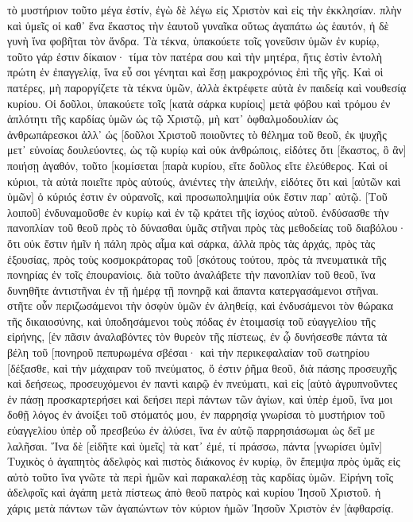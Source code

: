 τὸ μυστήριον τοῦτο μέγα ἐστίν, ἐγὼ δὲ λέγω εἰς Χριστὸν καὶ εἰς τὴν ἐκκλησίαν. 
πλὴν καὶ ὑμεῖς οἱ καθ᾽ ἕνα ἕκαστος τὴν ἑαυτοῦ γυναῖκα οὕτως ἀγαπάτω ὡς ἑαυτόν, ἡ δὲ γυνὴ ἵνα φοβῆται τὸν ἄνδρα. 
Τὰ τέκνα, ὑπακούετε τοῖς γονεῦσιν ὑμῶν ἐν κυρίῳ, τοῦτο γάρ ἐστιν δίκαιον· 
τίμα τὸν πατέρα σου καὶ τὴν μητέρα, ἥτις ἐστὶν ἐντολὴ πρώτη ἐν ἐπαγγελίᾳ, 
ἵνα εὖ σοι γένηται καὶ ἔσῃ μακροχρόνιος ἐπὶ τῆς γῆς. 
Καὶ οἱ πατέρες, μὴ παροργίζετε τὰ τέκνα ὑμῶν, ἀλλὰ ἐκτρέφετε αὐτὰ ἐν παιδείᾳ καὶ νουθεσίᾳ κυρίου. 
Οἱ δοῦλοι, ὑπακούετε τοῖς [κατὰ σάρκα κυρίοις] μετὰ φόβου καὶ τρόμου ἐν ἁπλότητι τῆς καρδίας ὑμῶν ὡς τῷ Χριστῷ, 
μὴ κατ᾽ ὀφθαλμοδουλίαν ὡς ἀνθρωπάρεσκοι ἀλλ᾽ ὡς [δοῦλοι Χριστοῦ ποιοῦντες τὸ θέλημα τοῦ θεοῦ, ἐκ ψυχῆς 
μετ᾽ εὐνοίας δουλεύοντες, ὡς τῷ κυρίῳ καὶ οὐκ ἀνθρώποις, 
εἰδότες ὅτι [ἕκαστος, ὃ ἂν] ποιήσῃ ἀγαθόν, τοῦτο [κομίσεται [παρὰ κυρίου, εἴτε δοῦλος εἴτε ἐλεύθερος. 
Καὶ οἱ κύριοι, τὰ αὐτὰ ποιεῖτε πρὸς αὐτούς, ἀνιέντες τὴν ἀπειλήν, εἰδότες ὅτι καὶ [αὐτῶν καὶ ὑμῶν] ὁ κύριός ἐστιν ἐν οὐρανοῖς, καὶ προσωπολημψία οὐκ ἔστιν παρ᾽ αὐτῷ. 
[Τοῦ λοιποῦ] ἐνδυναμοῦσθε ἐν κυρίῳ καὶ ἐν τῷ κράτει τῆς ἰσχύος αὐτοῦ. 
ἐνδύσασθε τὴν πανοπλίαν τοῦ θεοῦ πρὸς τὸ δύνασθαι ὑμᾶς στῆναι πρὸς τὰς μεθοδείας τοῦ διαβόλου· 
ὅτι οὐκ ἔστιν ἡμῖν ἡ πάλη πρὸς αἷμα καὶ σάρκα, ἀλλὰ πρὸς τὰς ἀρχάς, πρὸς τὰς ἐξουσίας, πρὸς τοὺς κοσμοκράτορας τοῦ [σκότους τούτου, πρὸς τὰ πνευματικὰ τῆς πονηρίας ἐν τοῖς ἐπουρανίοις. 
διὰ τοῦτο ἀναλάβετε τὴν πανοπλίαν τοῦ θεοῦ, ἵνα δυνηθῆτε ἀντιστῆναι ἐν τῇ ἡμέρᾳ τῇ πονηρᾷ καὶ ἅπαντα κατεργασάμενοι στῆναι. 
στῆτε οὖν περιζωσάμενοι τὴν ὀσφὺν ὑμῶν ἐν ἀληθείᾳ, καὶ ἐνδυσάμενοι τὸν θώρακα τῆς δικαιοσύνης, 
καὶ ὑποδησάμενοι τοὺς πόδας ἐν ἑτοιμασίᾳ τοῦ εὐαγγελίου τῆς εἰρήνης, 
[ἐν πᾶσιν ἀναλαβόντες τὸν θυρεὸν τῆς πίστεως, ἐν ᾧ δυνήσεσθε πάντα τὰ βέλη τοῦ [πονηροῦ πεπυρωμένα σβέσαι· 
καὶ τὴν περικεφαλαίαν τοῦ σωτηρίου [δέξασθε, καὶ τὴν μάχαιραν τοῦ πνεύματος, ὅ ἐστιν ῥῆμα θεοῦ, 
διὰ πάσης προσευχῆς καὶ δεήσεως, προσευχόμενοι ἐν παντὶ καιρῷ ἐν πνεύματι, καὶ εἰς [αὐτὸ ἀγρυπνοῦντες ἐν πάσῃ προσκαρτερήσει καὶ δεήσει περὶ πάντων τῶν ἁγίων, 
καὶ ὑπὲρ ἐμοῦ, ἵνα μοι δοθῇ λόγος ἐν ἀνοίξει τοῦ στόματός μου, ἐν παρρησίᾳ γνωρίσαι τὸ μυστήριον τοῦ εὐαγγελίου 
ὑπὲρ οὗ πρεσβεύω ἐν ἁλύσει, ἵνα ἐν αὐτῷ παρρησιάσωμαι ὡς δεῖ με λαλῆσαι. 
Ἵνα δὲ [εἰδῆτε καὶ ὑμεῖς] τὰ κατ᾽ ἐμέ, τί πράσσω, πάντα [γνωρίσει ὑμῖν] Τυχικὸς ὁ ἀγαπητὸς ἀδελφὸς καὶ πιστὸς διάκονος ἐν κυρίῳ, 
ὃν ἔπεμψα πρὸς ὑμᾶς εἰς αὐτὸ τοῦτο ἵνα γνῶτε τὰ περὶ ἡμῶν καὶ παρακαλέσῃ τὰς καρδίας ὑμῶν. 
Εἰρήνη τοῖς ἀδελφοῖς καὶ ἀγάπη μετὰ πίστεως ἀπὸ θεοῦ πατρὸς καὶ κυρίου Ἰησοῦ Χριστοῦ. 
ἡ χάρις μετὰ πάντων τῶν ἀγαπώντων τὸν κύριον ἡμῶν Ἰησοῦν Χριστὸν ἐν [ἀφθαρσίᾳ. 
